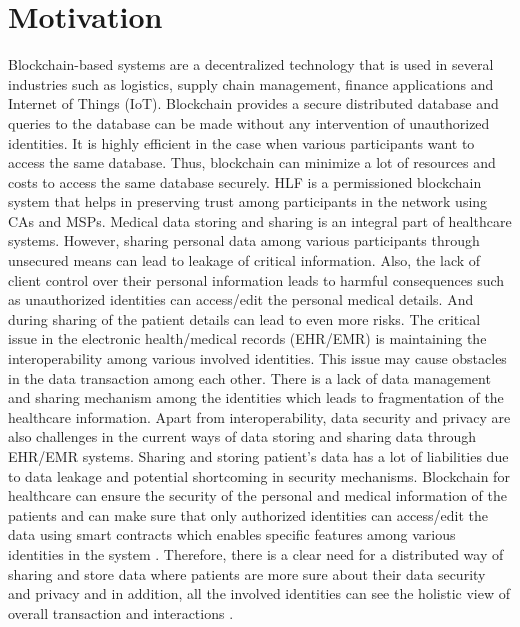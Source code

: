 %
%
\section{Motivation}
\label{sec:intro:motivation}

Blockchain-based systems are a decentralized technology that is used in several industries such as logistics, supply chain management, finance applications and Internet of Things (IoT)\cite{Beck}. Blockchain provides a secure distributed database and queries to the database can be made without any intervention of unauthorized identities. It is highly efficient in the case when various participants want to access the same database. Thus, blockchain can minimize a lot of resources and costs to access the same database securely. HLF is a permissioned blockchain system that helps in preserving trust among participants in the network using CAs and MSPs. Medical data storing and sharing is an integral part of healthcare systems. However, sharing personal data among various participants through unsecured means can lead to leakage of critical information. Also, the lack of client control over their personal information leads to harmful consequences such as unauthorized identities can access/edit the personal medical details. And during sharing of the patient details can lead to even more risks\cite{7996966}. The critical issue in the electronic health/medical records (EHR/EMR) is maintaining the interoperability among various involved identities. This issue may cause obstacles in the data transaction among each other. There is a lack of data management and sharing mechanism among the identities which leads to fragmentation of the healthcare information. Apart from interoperability, data security and privacy are also challenges in the current ways of data storing and sharing data through EHR/EMR systems\cite{Peterson2016ABA}. Sharing and storing patient's data has a lot of liabilities due to data leakage and potential shortcoming in security mechanisms. Blockchain for healthcare can ensure the security of the personal and medical information of the patients and can make sure that only authorized identities can access/edit the data using smart contracts which enables specific features among various identities in the system \cite{Tanwar2020}. Therefore, there is a clear need for a distributed way of sharing and store data where patients are more sure about their data security and privacy and in addition, all the involved identities can see the holistic view of overall transaction and interactions \cite{8531136}.